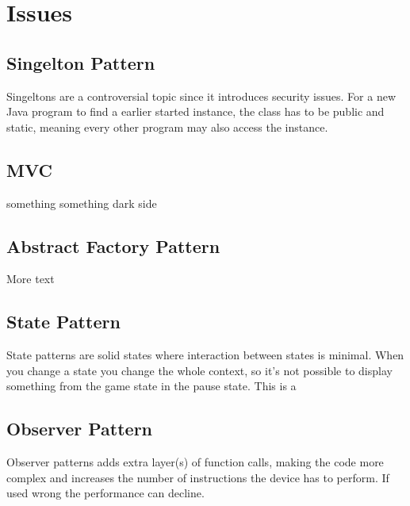 \chapter{Issues}
\section{Singelton Pattern}
	Singeltons are a controversial topic since it introduces security issues. For a new Java program to find a earlier started instance, the class has to be public and static, meaning every other program may also access the instance. 

\section{MVC}
	something something dark side

\section{Abstract Factory Pattern}
	More text %

\section{State Pattern}
	State patterns are solid states where interaction between states is minimal. When you change a state you change the whole context, so it's not possible to display something from the game state in the pause state. This is a 

\section{Observer Pattern}
	Observer patterns adds extra layer(s) of function calls, making the code more complex and increases the number of instructions the device has to perform. If used wrong the performance can decline.